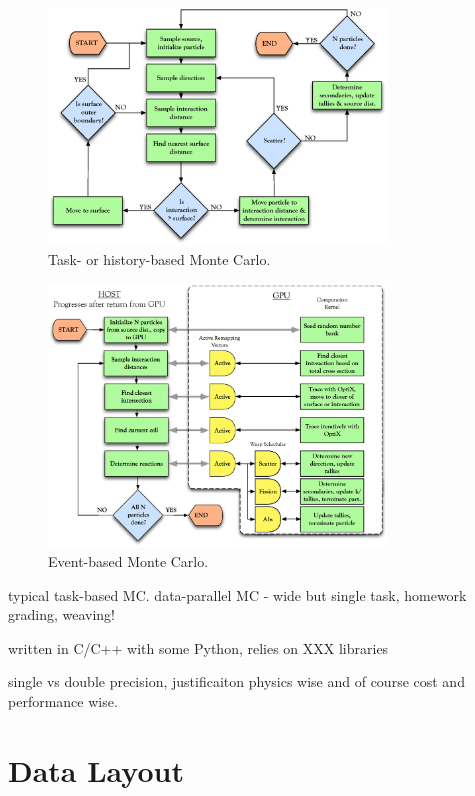\begin{figure}[h!] 
\centering
\includegraphics[width=0.8\textwidth]{graphics/task_based_alg.eps}
\caption{Task- or history-based Monte Carlo. \label{task_based_alg} }
\end{figure}

\begin{figure}[h!] 
\centering
\includegraphics[width=0.8\textwidth]{graphics/event_based_alg.eps}
\caption{Event-based Monte Carlo. \label{event_based_alg} }
\end{figure}


typical task-based MC.  data-parallel MC - wide but single task, homework grading, weaving!

written in C/C++ with some Python, relies on XXX libraries

single vs double precision, justificaiton physics wise and of course cost and performance wise.


\section{Data Layout}

